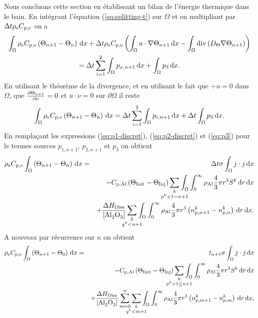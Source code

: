 Nous concluons cette section en établissant un bilan de l'énergie
thermique dans le bain. En intégrant l'équation (\ref{eq:splitting-t})
sur $\Omega$ et en multipliant par $\Delta t\rho_\mathrm{e}C_{\mathrm{p,e}}$
on a
\begin{multline}
\int_\Omega\rho_\mathrm{e}C_{\mathrm{p,e}}\left( \Theta_{n+1}
- \Theta_n \right)\,\mathrm dx
+\Delta t\rho_\mathrm{e}C_{\mathrm{p,e}}\left( \int_\Omega
  u\cdot\nabla\Theta_{n+1}\,\mathrm dx - \int_\Omega
  \mathrm{div}\left( D_\Theta\nabla\Theta_{n+1} \right) \right) \\
= \Delta t\sum_{i=1}^2\int_\Omega p_{x,n+1}\,\mathrm dx + \int_\Omega p_3\,\mathrm dx.
\end{multline}
En utilisant le théorème de la divergence, et en utilisant le fait que
$\div u = 0$ dans $\Omega$, que $\frac{\partial
  \Theta_{n+1}}{\partial \nu} = 0$ et $u\cdot \nu = 0$ sur
$\partial \Omega$ il reste
\begin{equation}
  \int_\Omega\rho_\mathrm{e}C_{\mathrm{p,e}}\left( \Theta_{n+1} - \Theta_n \right)\,\mathrm dx = \Delta t\sum_{i=1}^2\int_\Omega p_{i,n+1}\,\mathrm dx + \Delta t\int_\Omega p_3\,\mathrm dx.
\end{equation}
En remplaçant les expressions (\ref{eq:p1-discret}), (\ref{eq:p2-discret}) et (\ref{eq:p3}) pour le termes sources $p_{1,n+1}$, $p_{2,n+1}$ et $p_3$ on obtient
\begin{eqnarray*}
  \electrolytedensity\electrolytehc\int_\Omega\parent{\temperature_{n+1} - \temperature_n}\intd{x} &=& \dt \conductivity\int_\Omega j\cdot j\intd{x}\\
  && - \aluminahc\parent{\tinit - \tinj}\sum_{\mathclap{\substack{k\\ p^k + 1 = n+1}}}\int_\Omega\int_0^\infty \aluminadensity \frac{4}{3}\pi r^3 S^k\intd{r}\intd{x}\\
  && + \frac{\aluminadissolutionenthalpy}{[\cee{Al2O3}]}\sum_{\mathclap{\substack{k\\ q^k < n+1}}} \int_\Omega\int_0^\infty \aluminadensity \frac{4}{3}\pi r^3\parent{n_{p,n+1}^k-n_{p,n}^k}\intd{r}\intd{x}.
\end{eqnarray*}
A nouveau par récurrence sur $n$ on obtient
\begin{eqnarray}
  \electrolytedensity\electrolytehc\int_\Omega\parent{\temperature_{n+1} - \temperature_0}\intd{x} &=& t_{n+1} \conductivity\int_\Omega j\cdot j\intd{x}\nonumber\\
  && - \aluminahc\parent{\tinit - \tinj}\sum_{\mathclap{\substack{k\\ p^k + 1 \leq n+1}}}\int_\Omega\int_0^\infty \aluminadensity \frac{4}{3}\pi r^3 S^k\intd{r}\intd{x}\nonumber\\
  && + \frac{\aluminadissolutionenthalpy}{[\cee{Al2O3}]}\sum_{m = 0}^{n}\sum_{\mathclap{\substack{k\\ q^k < m + 1}}} \int_\Omega\int_0^\infty \aluminadensity \frac{4}{3}\pi r^3\parent{n_{p,m+1}^k-n_{p,m}^k}\intd{r}\intd{x},\label{eq:energy-mass-balance}
\end{eqnarray}

